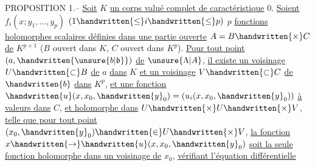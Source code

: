 PROPOSITION 1.-- \uline{Soit} $K$ \uline{un corps valué complet de caractéristique} $0$.
\uline{Soient} $f_i(x;y_1,\ldots,y_p)$ $(1\handwritten{\leq}i\handwritten{\leq}p)$ $p$ \uline{fonctions holomorphes scalaires
définies dans une partie ouverte} $A=B\handwritten{\times} C$ \uline{de} $K^{p+1}$ ($B$ ouvert dans $K$, $C$
ouvert dans $K^p$). \uline{Pour tout point} $(a,\handwritten{\unsure{b|\mathfrak b}})$ \uline{de} $\unsure{\Lambda|A}$, \uline{il existe un voisinage}
$U\handwritten{\subset}B$ \uline{de} $a$ \uline{dans} $K$ \uline{et un voisinage} $V\handwritten{\subset} C$ \uline{de} $\handwritten{b}$ \uline{dans} $K^p$, \uline{et une
fonction} $\handwritten{u}(x,x_0,\handwritten{y}_0)=(u_i(x,x_0,\handwritten{y}_0))$ \uline{à valeurs dans} $C$, \uline{et holomorphe
dans} $U\handwritten{\times} U\handwritten{\times} V$, \uline{telle que pour tout point} $(x_0,\handwritten{y}_0)\handwritten{\in} U\handwritten{\times} V$, \uline{la fonction}
$x\handwritten{\to}\handwritten{u}(x,x_0,\handwritten{y}_0)$ \uline{soit la seule fonction holomorphe dans un voisinage
de} $x_0$, \uline{vérifiant l'équation différentielle}
